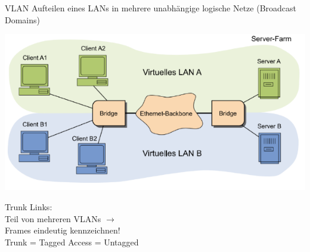 \begin{definition}{VLAN}
    Aufteilen eines LANs in mehrere unabhängige logische Netze (Broadcast Domains)\\
    \begin{minipage}{0.65\linewidth}
        \includegraphics[width=1\linewidth]{images/vlan.png}
    \end{minipage}
    \begin{minipage}{0.3\linewidth}
        Trunk Links: \\
        Teil von mehreren VLANs $\rightarrow$ \\
        Frames eindeutig kennzeichnen!
        \vspace{1mm}\\
        Trunk = Tagged Access = Untagged
    \end{minipage}
\end{definition}

